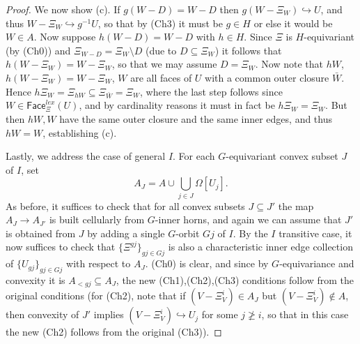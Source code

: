\documentclass[a4paper,10pt
,draft
]{article}%
\begin{document}
\begin{proof}
We now show (c).
If $g(W-D) = W-D$ then $g(W - \Xi_W) \hookrightarrow U$,
and thus $W - \Xi_W \hookrightarrow g^{-1}U$,
so that by (Ch3) it must be $g \in H$ or else it would be $W \in A$.
Now suppose $h(W-D)=W-D$ with $h\in H$.
Since $\Xi$ is $H$-equivariant (by (Ch0)) and
$\Xi_{W-D} = \Xi_{W} \setminus D$ (due to $D \subseteq \Xi_{W}$) it follows that 
$h(W-\Xi_W) = W-\Xi_W$,
so that we may assume $D = \Xi_W$.
Now note that
$hW$, $h(W-\Xi_W)=W-\Xi_W$, $W$
are all faces of $U$ with a common outer closure $\bar{W}$.
Hence
$h\Xi_{W} = \Xi_{hW} \subseteq \Xi_{\bar{W}} = \Xi_{W}$, where the last step follows since
$W \in \mathsf{Face}_{\Xi}^{lex}(U)$, and by cardinality reasons it must in fact be $h \Xi_{W} = \Xi_{W}$. But then $hW,W$
have the same outer closure and the same inner edges, and thus 
$hW=W$, establishing (c).

Lastly, we address the case of general $I$.
For each $G$-equivariant convex subset $J$ of $I$, set
\[
	A_J = 
	A \cup \bigcup_{j \in J} \Omega[U_j].
\]
As before, it suffices to check that for all convex subsets
$J \subseteq J'$
the map $A_J \to A_{J'}$ is built cellularly from $G$-inner horns,
and again we can assume that $J'$ is obtained from $J$ by adding a single $G$-orbit $Gj$ of $I$.
By the $I$ transitive case, it now suffices to check that
$\{\Xi^{gj}\}_{gj \in Gj}$ is also a characteristic inner edge collection of $\{U_{g j}\}_{g j \in Gj}$ with respect to $A_J$.
(Ch0) is clear, and since by $G$-equivariance and convexity it is $A_{<gj} \subseteq A_J$,
the new (Ch1),(Ch2),(Ch3)
conditions follow from the original conditions
(for (Ch2), note that if 
$(V - \Xi^i_V) \in A_J$ but $(V - \Xi^i_V) \nin A$, then convexity of $J'$ implies $(V - \Xi^i_V) \hookrightarrow U_j$ for some $j \not \geq i$, so that in this case the new (Ch2) follows from the original (Ch3)).
\end{proof}
\end{document}
